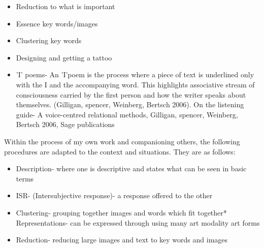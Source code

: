 \begin{itemize}
\item Reduction to what is important 
\end{itemize}

\begin{itemize}
\item Essence key words/images
\end{itemize}

\begin{itemize}
\item Clustering key words
\end{itemize}

\begin{itemize}
\item Designing and getting a tattoo
\end{itemize}

\begin{itemize}
\item  'I' poems- An 'I'poem is the process where a piece of text is underlined only with the I and the accompanying word. This highlights associative stream of consciousness carried by the first person and how the writer speaks about themselves. (Gilligan, spencer, Weinberg, Bertsch 2006). On the listening guide- A voice-centred relational methods, Gilligan, spencer, Weinberg, Bertsch 2006, Sage publications
\end{itemize}

Within the process of my own work and companioning others, the following procedures are adapted to the context and situations. They are as follows:
\begin{itemize}
\item Description- where one is descriptive and states what can be seen in basic terms 
\end{itemize}

\begin{itemize}
\item ISR- (Intersubjective response)- a response offered to the other
\end{itemize}

\begin{itemize}
\item  Clustering- grouping together images and words which fit together* Representations- can be expressed through using many art modality art forms
\end{itemize}

\begin{itemize}
\item Reduction- reducing large images and text to key words and images 
\end{itemize}


